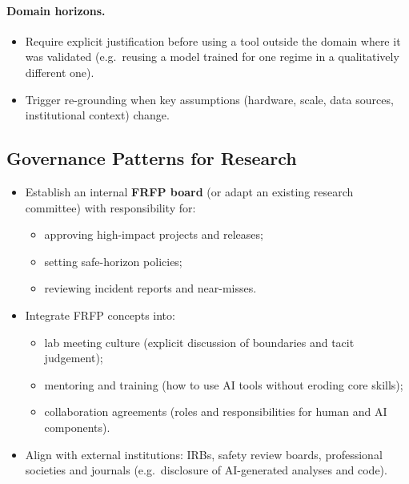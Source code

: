 \paragraph{Domain horizons.}

\begin{itemize}
  \item Require explicit justification before using a tool outside the
        domain where it was validated (e.g.\ reusing a model trained
        for one regime in a qualitatively different one).
  \item Trigger re-grounding when key assumptions (hardware, scale,
        data sources, institutional context) change.
\end{itemize}

\subsection{Governance Patterns for Research}

\begin{itemize}
  \item Establish an internal \textbf{FRFP board} (or adapt an existing
        research committee) with responsibility for:
        \begin{itemize}
          \item approving high-impact projects and releases;
          \item setting safe-horizon policies;
          \item reviewing incident reports and near-misses.
        \end{itemize}
  \item Integrate FRFP concepts into:
        \begin{itemize}
          \item lab meeting culture (explicit discussion of boundaries
                and tacit judgement);
          \item mentoring and training (how to use AI tools without
                eroding core skills);
          \item collaboration agreements (roles and responsibilities for
                human and AI components).
        \end{itemize}
  \item Align with external institutions:
        IRBs, safety review boards, professional societies and journals
        (e.g.\ disclosure of AI-generated analyses and code).
\end{itemize}

